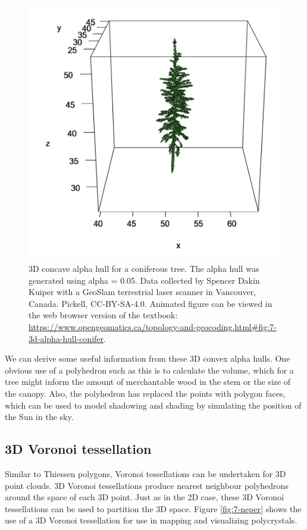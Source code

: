 \documentclass[
]{book}
\begin{document}
\begin{figure}
\includegraphics[width=0.75\linewidth]{images/07-3d-alpha-hull-conifer-static} \caption{3D concave alpha hull for a coniferous tree. The alpha hull was generated using alpha = 0.05. Data collected by Spencer Dakin Kuiper with a GeoSlam terrestrial laser scanner in Vancouver, Canada. Pickell, CC-BY-SA-4.0. Animated figure can be viewed in the web browser version of the textbook: \url{https://www.opengeomatics.ca/topology-and-geocoding.html\#fig:7-3d-alpha-hull-conifer}.}\label{fig:7-3d-alpha-hull-conifer}
\end{figure}

We can derive some useful information from these 3D convex alpha hulls. One obvious use of a polyhedron such as this is to calculate the volume, which for a tree might inform the amount of merchantable wood in the stem or the size of the canopy. Also, the polyhedron has replaced the points with polygon faces, which can be used to model shadowing and shading by simulating the position of the Sun in the sky.

\subsection{3D Voronoi tessellation}\label{d-voronoi-tessellation}

Similar to Thiessen polygons, Voronoi tessellations can be undertaken for 3D point clouds. 3D Voronoi tessellations produce nearest neighbour polyhedrons around the space of each 3D point. Just as in the 2D case, these 3D Voronoi tessellations can be used to partition the 3D space. Figure \ref{fig:7-neper} shows the use of a 3D Voronoi tessellation for use in mapping and visualizing polycrystals.
\end{document}
